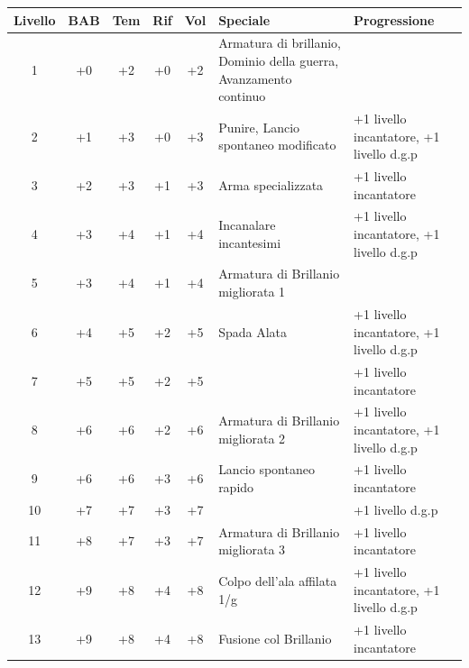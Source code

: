 \documentclass[10pt, a4paper]{report}
\begin{document}
\hspace{-1.25cm}
{\sffamily
\begin{tabular}{|c|c|c|c|c|p{6cm}|p{6cm}|}
\hline
\textbf{Livello} & \textbf{BAB} & \textbf{Tem} & \textbf{Rif} & \textbf{Vol} & \textbf{Speciale} & \textbf{Progressione} \\ 
\hline
1  & +0 & +2 & +0 & +2 & Armatura di brillanio, Dominio della guerra, Avanzamento continuo &  \\ 
\hline
2  & +1 & +3 & +0 & +3 & Punire, Lancio spontaneo modificato & +1 livello incantatore, +1 livello d.g.p\\ 
\hline
3  & +2 & +3 & +1 & +3 & Arma specializzata & +1 livello incantatore \\ 
\hline
4  & +3 & +4 & +1 & +4 & Incanalare incantesimi & +1 livello incantatore, +1 livello d.g.p\\ 
\hline
5  & +3 & +4 & +1 & +4 & Armatura di Brillanio migliorata 1 &  \\ 
\hline
6  & +4 & +5 & +2 & +5 & Spada Alata & +1 livello incantatore, +1 livello d.g.p \\ 
\hline
7  & +5 & +5 & +2 & +5 &   & +1 livello incantatore \\ 
\hline
8  & +6 & +6 & +2 & +6 & Armatura di Brillanio migliorata 2 & +1 livello incantatore, +1 livello d.g.p \\ 
\hline
9  & +6 & +6 & +3 & +6 & Lancio spontaneo rapido & +1 livello incantatore \\ 
\hline
10 & +7 & +7 & +3 & +7 &   & +1 livello d.g.p \\ 
\hline
11 & +8 & +7 & +3 & +7 & Armatura di Brillanio migliorata 3 & +1 livello incantatore \\ 
\hline
12 & +9 & +8 & +4 & +8 & Colpo dell’ala affilata 1/g & +1 livello incantatore, +1 livello d.g.p \\ 
\hline
13 & +9 & +8 & +4 & +8 & Fusione col Brillanio & +1 livello incantatore \\ 
\hline
\end{tabular}
}
\end{document}
